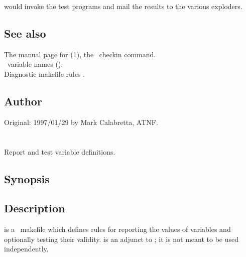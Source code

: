 \noindent
would invoke the test programs and mail the results to the various exploders.
 
\subsection*{See also}
 
The manual page for (1), the \rcs\ checkin command.\\
\aipspp\ variable names ().\\
Diagnostic makefile rules .
 
\subsection*{Author}
 
Original: 1997/01/29 by Mark Calabretta, ATNF.

 
\newpage
\section{}
\label{testdefs}
 
Report and test  variable definitions.
 
\subsection*{Synopsis}
 
\begin{synopsis}
\end{synopsis}
 
\subsection*{Description}
 
 is a \gnu\ makefile which defines rules for reporting the
values of  variables and optionally testing their validity.
 is an adjunct to ; it is not meant to be used
independently.

